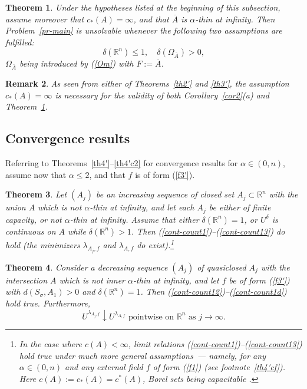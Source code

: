 \documentclass[12pt,a4paper,reqno]{amsart} %
\theoremstyle{lause}
\theoremstyle{maaritelma}
\theoremstyle{lause}
\newtheorem{theorem}{Theorem}[section]
\theoremstyle{maaritelma}
\newtheorem{remark}[theorem]{Remark}
\numberwithin{equation}{section}
\begin{document}
\begin{theorem}\label{th-th} Under the hypotheses listed at the beginning of this subsection, assume moreover that $c_*(A)=\infty$, and that $\overline{A}$ is $\alpha$-thin at infinity. Then Problem~{\rm\ref{pr-main}} is unsolvable whenever the following two assumptions are fulfilled:
\begin{equation*}\label{nons}
 \delta(\mathbb R^n)\leqslant1,\quad\delta(\Omega_{\overline{A}})>0,
\end{equation*}
$\Omega_{\overline{A}}$ being introduced by {\rm(\ref{Om})} with $F:=\overline{A}$.
\end{theorem}

\begin{remark}
As seen from either of Theorems~\ref{th2'} and \ref{th3'}, the assumption $c_*(A)=\infty$ is necessary for the validity of both Corollary~\ref{cor2}(a) and Theorem~\ref{th-th}.
\end{remark}

\subsection{Convergence results} Referring to Theorems~\ref{th4'}--\ref{th4'c2} for convergence results for $\alpha\in(0,n)$, assume now that $\alpha\leqslant2$, and that $f$ is of form (\ref{f3'}).

\begin{theorem}\label{conv6}
Let $(A_j)$ be an increasing sequence of closed set $A_j\subset\mathbb R^n$ with the union $A$ which is not $\alpha$-thin at infinity, and let each $A_j$ be either of finite capacity, or not $\alpha$-thin at infinity. Assume that either $\delta(\mathbb R^n)=1$, or $U^\delta$ is continuous on $A$ while $\delta(\mathbb R^n)>1$. Then {\rm(\ref{cont-count1})}--{\rm(\ref{cont-count13})} do hold {\rm(}the minimizers $\lambda_{A_j,f}$ and $\lambda_{A,f}$ do exist{\rm)}.\footnote{In the case where $c(A)<\infty$, limit relations (\ref{cont-count1})--(\ref{cont-count13}) hold true under much more general assumptions~--- namely, for any $\alpha\in(0,n)$ and any external field $f$ of form (\ref{f1}) (see footnote~\ref{th4'cf}). Here $c(A):=c_*(A)=c^*(A)$, Borel sets being {\it capacitable} \cite[Theorem~2.8]{L}.}
\end{theorem}

\begin{theorem}\label{conv7}
Consider a decreasing sequence $(A_j)$ of quasiclosed $A_j$ with the intersection $A$ which is not inner $\alpha$-thin at infinity, and let $f$ be of form {\rm(\ref{f3'})} with $d(S_\sigma,A_1)>0$ and $\delta(\mathbb R^n)=1$. Then {\rm(\ref{cont-count12})}--{\rm(\ref{cont-count1d})} hold true. Furthermore,
\begin{equation}\label{cont-count1du}
 U^{\lambda_{A_j,f}}\downarrow U^{\lambda_{A,f}}\text{ \ pointwise on $\mathbb R^n$ as $j\to\infty$}.
\end{equation}
\end{theorem}
\end{document}
